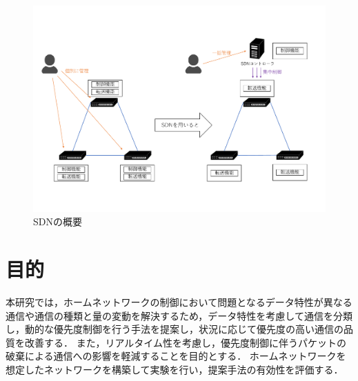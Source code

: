 \documentclass[a4paper,11pt,uplatex]{ujreport}
\begin{document}
  \begin{figure}[tb]
    \centering
    \includegraphics[width=\linewidth]{img/SDN_trimmed.pdf}
    \caption{SDNの概要}
    \label{fig:sdn}
  \end{figure}

\section{目的}
\label{sec:目的}

    本研究では，ホームネットワークの制御において問題となるデータ特性が異なる通信や通信の種類と量の変動を解決するため，データ特性を考慮して通信を分類し，動的な優先度制御を行う手法を提案し，状況に応じて優先度の高い通信の品質を改善する．
    また，リアルタイム性を考慮し，優先度制御に伴うパケットの破棄による通信への影響を軽減することを目的とする．
    ホームネットワークを想定したネットワークを構築して実験を行い，提案手法の有効性を評価する．




\end{document}
